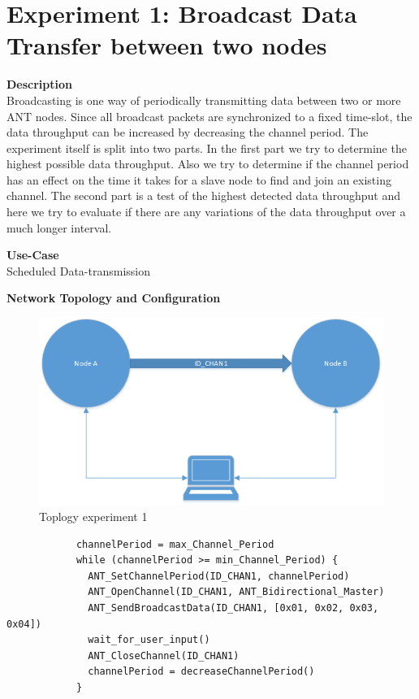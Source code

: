 \section{Experiment 1: Broadcast Data Transfer between two nodes}
\begin{description} 
	\item{\textbf{Description}} \hfill \\ Broadcasting is one way of periodically transmitting data between two or more ANT nodes. Since all broadcast packets are synchronized to a fixed time-slot, the data throughput can be increased by decreasing the channel period. The experiment itself is split into two parts. In the first part we try to determine the highest possible data throughput. Also we try to determine if the channel period has an effect on the time it takes for a slave node to find and join an existing channel. The second part is a test of the highest detected data throughput and here we try to evaluate if there are any variations of the data throughput over a much longer interval.	
	\item{\textbf{Use-Case}} \hfill \\ Scheduled Data-transmission	
	\item{\textbf{Network Topology and Configuration}} \hfill \\ 
	\begin{figure}[H]
		\centering
		\includegraphics[scale=0.6]{./pics/exp1_topo.png}
		\caption{Toplogy experiment 1}
	\end{figure}
		\begin{code}[H]
			\begin{verbatim}
			channelPeriod = max_Channel_Period
			while (channelPeriod >= min_Channel_Period) {
			  ANT_SetChannelPeriod(ID_CHAN1, channelPeriod)
			  ANT_OpenChannel(ID_CHAN1, ANT_Bidirectional_Master)
			  ANT_SendBroadcastData(ID_CHAN1, [0x01, 0x02, 0x03, 0x04])
			  wait_for_user_input()
			  ANT_CloseChannel(ID_CHAN1)
			  channelPeriod = decreaseChannelPeriod()
			}
			\end{verbatim}
			\caption{Broadcast data single channel (Master)}\label{lst:mExp1}
		\end{code}
		

\end{description}
